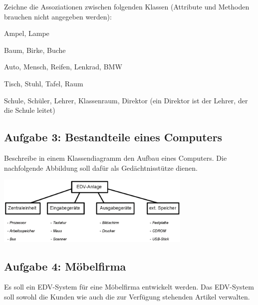 Zeichne die Assoziationen zwischen folgenden Klassen (Attribute und Methoden brauchen nicht angegeben
werden):

\begin{compactenum}[a)]
\item Ampel, Lampe
\item Baum, Birke, Buche
\item Auto, Mensch, Reifen, Lenkrad, BMW
\item Tisch, Stuhl, Tafel, Raum
\item Schule, Schüler, Lehrer, Klassenraum, Direktor (ein Direktor ist der
Lehrer, der die Schule leitet) 
\end{compactenum}


\subsection{Aufgabe 3: Bestandteile eines Computers}

Beschreibe in einem Klassendiagramm den Aufbau eines Computers. Die
nachfolgende Abbildung soll dafür als Gedächtnisstütze dienen.

\begin{center}
\includegraphics[width=0.7\textwidth]{./inf/SEKII/15_UML_Klassendiagramme/Computer-Komponenten.png}
\end{center}


\subsection{Aufgabe 4: Möbelfirma}

Es soll ein EDV-System für eine Möbelfirma entwickelt werden. Das EDV-System
soll sowohl die Kunden wie auch die zur Verfügung stehenden Artikel verwalten.

